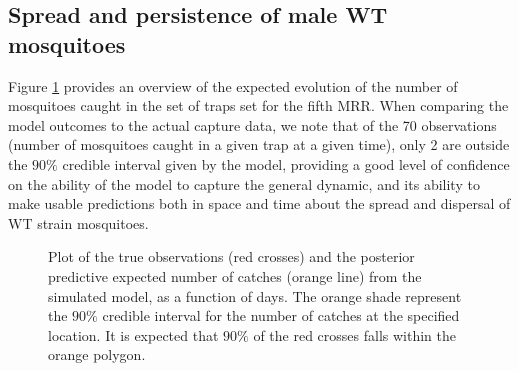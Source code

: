 \documentclass[]{bmcart}
\begin{document}
\subsection{Spread and persistence of male WT mosquitoes}
Figure \ref{fig:Post_Data} provides an overview of the expected evolution of the number of mosquitoes caught in the set of traps set for the fifth MRR. When comparing the model outcomes to the actual capture data, we note that of the 70 observations (number of mosquitoes caught in a given trap at a given time), only 2 are outside the $90\%$ credible interval given by the model, providing a good level of confidence on the ability of the model to capture the general dynamic, and its ability to make usable predictions both in space and time about the spread and dispersal of WT strain mosquitoes.  


\begin{figure}[t]
\caption[Plot of the true observations (red crosses) and the expected number of catches (orange line) from the simulated model]{Plot of the true observations (red crosses) and the posterior predictive expected number of catches (orange line) from the simulated model, as a function of days. The orange shade represent the $90\%$ credible interval for the number of catches at the specified location. It is expected that $90\%$ of the red crosses falls within the orange polygon.}\label{fig:Post_Data}
\end{figure}
\end{document}
